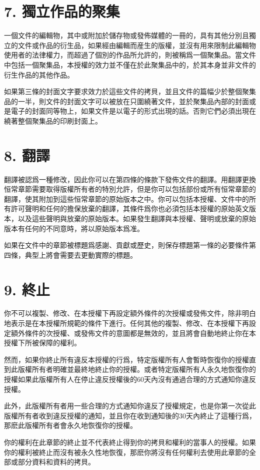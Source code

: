 \section{7. 獨立作品的聚集}
一個文件的編輯物，其中或附加於儲存物或發佈媒體的一冊的，具有其他分別且獨立的文件或作品的衍生品，如果經由編輯而産生的版權，並沒有用來限制此編輯物使用者的法律權力，而超過了個別的作品所允許的，則被稱爲一個聚集品。當文件中包括一個聚集品，本授權的效力並不僅在於此聚集品中的，於其本身並非文件的衍生作品的其他作品。\par
如果第三條的封面文字要求效力於這些文件的拷貝，並且文件的篇幅少於整個聚集品的一半，則文件的封面文字可以被放在只圍繞著文件，並於聚集品內部的封面或是電子的封面同等物上，如果文件是以電子的形式出現的話。否則它們必須出現在繞著整個聚集品的印刷封面上。
\section{8. 翻譯}
翻譯被認爲一種修改，因此你可以在第四條的條款下發佈文件的翻譯。用翻譯更換恒常章節需要取得版權所有者的特別允許，但是你可以包括部份或所有恒常章節的翻譯，使其附加到這些恒常章節的原始版本之中。你可以包括本授權、文件中的所有許可聲明和任何的擔保放棄的翻譯，其條件爲你也必須包括本授權的原始英文版本，以及這些聲明與放棄的原始版本。如果發生翻譯與本授權、聲明或放棄的原始版本有任何的不同意時，將以原始版本爲准。\par
如果在文件中的章節被標題爲感謝、貢獻或歷史，則保存標題第一條的必要條件第四條，典型上將會需要去更動實際的標題。
\section{9. 終止}
你不可以複製、修改、在本授權下再設定額外條件的次授權或發佈文件，除非明白地表示是在本授權所規範的條件下進行。任何其他的複製、修改、在本授權下再設定額外條件的次授權、或發佈文件的意圖都是無效的，並且將會自動地終止你在本授權下所被保障的權利。\par
然而，如果你終止所有違反本授權的行爲，特定版權所有人會暫時恢復你的授權直到此版權所有者明確並最終地終止你的授權。或者特定版權所有人永久地恢復你的授權如果此版權所有人在停止違反授權後的60天內沒有通過合理的方式通知你違反授權。\par
此外，此版權所有者用一些合理的方式通知你違反了授權規定，也是你第一次從此版權所有者收到違反授權的通知，並且你在收到通知後的30天內終止了這種行爲，那麽此版權所有者會永久地恢復你的授權。\par
你的權利在此章節的終止並不代表終止得到你的拷貝和權利的當事人的授權。如果你的權利被終止而沒有被永久性地恢復，那麽你將沒有任何權利去使用此章節的全部或部分資料和資料的拷貝。
